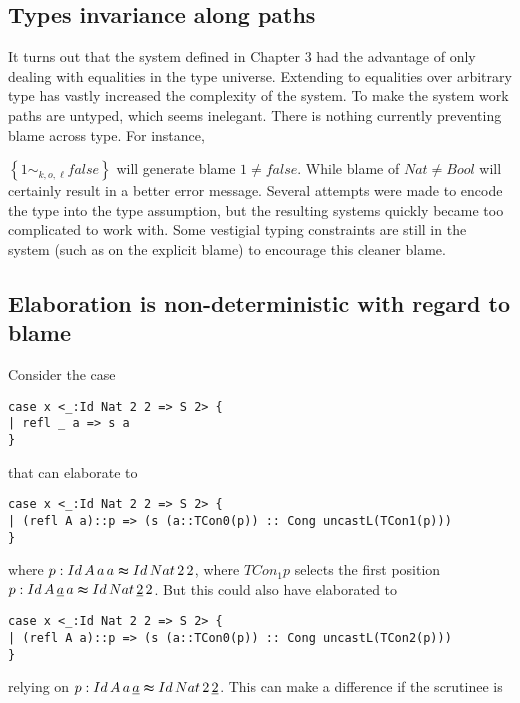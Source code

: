 \subsection{Types invariance along paths}

It turns out that the system defined in Chapter 3 had the advantage
of only dealing with equalities in the type universe. Extending to
equalities over arbitrary type has vastly increased the complexity
of the system. To make the system work paths are untyped, which seems
inelegant. There is nothing currently preventing blame across type.
For instance,

$\left\{ 1\sim_{k,o,\ell}false\right\} $ will generate blame $1\neq false$.
While blame of $Nat\neq Bool$ will certainly result in a better error
message. Several attempts were made to encode the type into the type
assumption, but the resulting systems quickly became too complicated
to work with. Some vestigial typing constraints are still in the system
(such as on the explicit blame) to encourage this cleaner blame. 

\subsection{Elaboration is non-deterministic with regard to blame}

Consider the case

\begin{lstlisting}[basicstyle={\ttfamily\small}]
case x <_:Id Nat 2 2 => S 2> {
| refl _ a => s a
}
\end{lstlisting}

that can elaborate to

\begin{lstlisting}[basicstyle={\ttfamily\small}]
case x <_:Id Nat 2 2 => S 2> {
| (refl A a)::p => (s (a::TCon0(p)) :: Cong uncastL(TCon1(p)))
}
\end{lstlisting}

where $p:Id\,A\,a\,a\thickapprox Id\,Nat\,2\,2$, where $TCon_{1}p$
selects the first position $p:Id\,A\,\underline{a}\,a\thickapprox Id\,Nat\,\underline{2}\,2$.
But this could also have elaborated to 

\begin{lstlisting}[basicstyle={\ttfamily\small}]
case x <_:Id Nat 2 2 => S 2> {
| (refl A a)::p => (s (a::TCon0(p)) :: Cong uncastL(TCon2(p)))
}
\end{lstlisting}

relying on $p:Id\,A\,a\,\underline{a}\thickapprox Id\,Nat\,2\,\underline{2}$.
This can make a difference if the scrutinee is 

